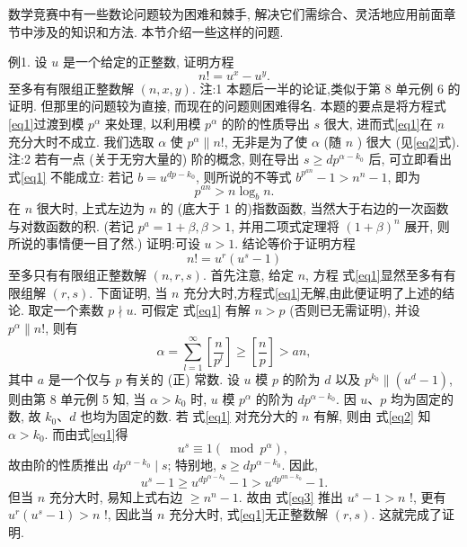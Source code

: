 
数学竞赛中有一些数论问题较为困难和棘手, 解决它们需综合、灵活地应用前面章节中涉及的知识和方法.
本节介绍一些这样的问题.



例1. 设 $u$ 是一个给定的正整数, 证明方程
$$
n !=u^x-u^y . \label{eq1}
$$
至多有有限组正整数解 $(n, x, y)$.
注:1 本题后一半的论证,类似于第 8 单元例 6 的证明.
但那里的问题较为直接, 而现在的问题则困难得名.
本题的要点是将方程式\ref{eq1}过渡到模 $p^\alpha$ 来处理, 以利用模 $p^\alpha$ 的阶的性质导出 $s$ 很大, 进而式\ref{eq1}在 $n$ 充分大时不成立.
我们选取 $\alpha$ 使 $p^\alpha \| n !$, 无非是为了使 $\alpha$ (随 $n$ ) 很大 (见\ref{eq2}式).
注:2 若有一点 (关于无穷大量的) 阶的概念, 则在导出 $s \geqslant d p^{\alpha-k_0}$ 后, 可立即看出 式\ref{eq1} 不能成立: 若记 $b=u^{d p-k_0}$, 则所说的不等式 $b^{p^{a n}}-1>n^n-1$, 即为
$$
p^{a n}>n \log _b n .
$$
在 $n$ 很大时, 上式左边为 $n$ 的 (底大于 1 的)指数函数, 当然大于右边的一次函数与对数函数的积.
(若记 $p^a=1+\beta, \beta>1$, 并用二项式定理将 $(1+\beta)^n$ 展开, 则所说的事情便一目了然.)
证明:可设 $u>1$. 结论等价于证明方程
$$
n !=u^r\left(u^s-1\right)
$$
至多只有有限组正整数解 $(n, r, s)$.
首先注意, 给定 $n$, 方程 式\ref{eq1}显然至多有有限组解 $(r, s)$. 下面证明, 当 $n$ 充分大时,方程式\ref{eq1}无解,由此便证明了上述的结论.
取定一个素数 $p \nmid u$. 可假定 式\ref{eq1} 有解 $n>p$ (否则已无需证明), 并设 $p^\alpha \| n !$, 则有
$$
\alpha=\sum_{l=1}^{\infty}\left[\frac{n}{p^l}\right] \geqslant\left[\frac{n}{p}\right]>a n, \label{eq2}
$$
其中 $a$ 是一个仅与 $p$ 有关的 (正) 常数.
设 $u$ 模 $p$ 的阶为 $d$ 以及 $p^{k_0} \|\left(u^d-1\right)$, 则由第 8 单元例 5 知, 当 $\alpha>k_0$ 时, $u$ 模 $p^\alpha$ 的阶为 $d p^{\alpha-k_0}$. 因 $u 、 p$ 均为固定的数, 故 $k_0 、 d$ 也均为固定的数.
若 式\ref{eq1} 对充分大的 $n$ 有解, 则由 式\ref{eq2} 知 $\alpha>k_0$. 而由式\ref{eq1}得
$$
u^s \equiv 1\left(\bmod p^\alpha\right) \text {, }
$$
故由阶的性质推出 $d p^{\alpha-k_0} \mid s$; 特别地, $s \geqslant d p^{\alpha-k_0}$. 因此,
$$
u^s-1 \geqslant u^{d p^{\alpha-k_0}}-1>u^{d p^{a n-k_0}}-1 .\label{eq3}
$$
但当 $n$ 充分大时, 易知上式右边 $\geqslant n^n-1$. 故由 式\ref{eq3} 推出 $u^s-1>n$ !, 更有 $u^r\left(u^s-1\right)>n$ !, 因此当 $n$ 充分大时, 式\ref{eq1}无正整数解 $(r, s)$. 这就完成了证明.



